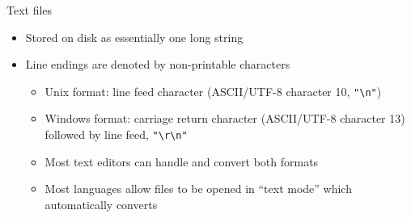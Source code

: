 \begin{frame}[fragile]{Text files}
    \begin{itemize}
        \pause\item Stored on disk as essentially one long string
        \pause\item Line endings are denoted by non-printable characters
            \begin{itemize}
                \pause\item Unix format: line feed character (ASCII/UTF-8 character 10, \lstinline{"\n"})
                \pause\item Windows format: carriage return character (ASCII/UTF-8 character 13) followed by line feed, \lstinline{"\r\n"}
                \pause\item Most text editors can handle and convert both formats
                \pause\item Most languages allow files to be opened in ``text mode'' which automatically converts
            \end{itemize}
    \end{itemize}
\end{frame}

